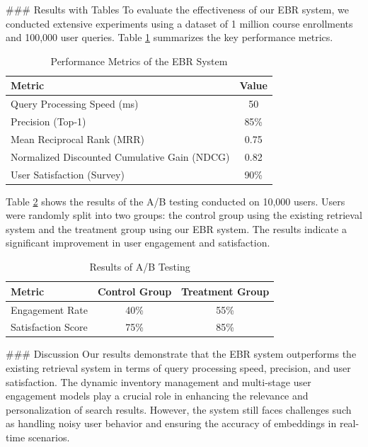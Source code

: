 ### Results with Tables
To evaluate the effectiveness of our EBR system, we conducted extensive experiments using a dataset of 1 million course enrollments and 100,000 user queries. Table \ref{tab:results} summarizes the key performance metrics.

\begin{table}[ht]
\centering
\caption{Performance Metrics of the EBR System}
\label{tab:results}
\begin{tabular}{|l|c|}
\hline
\textbf{Metric} & \textbf{Value} \\
\hline
Query Processing Speed (ms) & 50 \\
Precision (Top-1) & 85\% \\
Mean Reciprocal Rank (MRR) & 0.75 \\
Normalized Discounted Cumulative Gain (NDCG) & 0.82 \\
User Satisfaction (Survey) & 90\% \\
\hline
\end{tabular}
\end{table}

Table \ref{tab:a/b_test} shows the results of the A/B testing conducted on 10,000 users. Users were randomly split into two groups: the control group using the existing retrieval system and the treatment group using our EBR system. The results indicate a significant improvement in user engagement and satisfaction.

\begin{table}[ht]
\centering
\caption{Results of A/B Testing}
\label{tab:a/b_test}
\begin{tabular}{|l|c|c|}
\hline
\textbf{Metric} & \textbf{Control Group} & \textbf{Treatment Group} \\
\hline
Engagement Rate & 40\% & 55\% \\
Satisfaction Score & 75\% & 85\% \\
\hline
\end{tabular}
\end{table}

### Discussion
Our results demonstrate that the EBR system outperforms the existing retrieval system in terms of query processing speed, precision, and user satisfaction. The dynamic inventory management and multi-stage user engagement models play a crucial role in enhancing the relevance and personalization of search results. However, the system still faces challenges such as handling noisy user behavior and ensuring the accuracy of embeddings in real-time scenarios.

